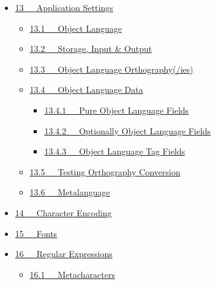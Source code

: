 \documentclass[letterpaper,10pt,english]{sphinxmanual}
\begin{document}
{\begin{minipage}{0.95\linewidth}
\begin{itemize}
\begin{itemize}
\begin{itemize}
\end{itemize}

\end{itemize}

\item {} 
{\hyperref[documentation:application-settings]{13   Application Settings}}
\begin{itemize}
\item {} 
{\hyperref[documentation:object-language]{13.1   Object Language}}

\item {} 
{\hyperref[documentation:storage-input-output]{13.2   Storage, Input \& Output}}

\item {} 
{\hyperref[documentation:object-language-orthography-ies]{13.3   Object Language Orthography(/ies)}}

\item {} 
{\hyperref[documentation:object-language-data]{13.4   Object Language Data}}
\begin{itemize}
\item {} 
{\hyperref[documentation:pure-object-language-fields]{13.4.1   Pure Object Language Fields}}

\item {} 
{\hyperref[documentation:optionally-object-language-fields]{13.4.2   Optionally Object Language Fields}}

\item {} 
{\hyperref[documentation:object-language-tag-fields]{13.4.3   Object Language Tag Fields}}

\end{itemize}

\item {} 
{\hyperref[documentation:testing-orthography-conversion]{13.5   Testing Orthography Conversion}}

\item {} 
{\hyperref[documentation:metalanguage]{13.6   Metalanguage}}

\end{itemize}

\item {} 
{\hyperref[documentation:character-encoding]{14   Character Encoding}}

\item {} 
{\hyperref[documentation:fonts]{15   Fonts}}

\item {} 
{\hyperref[documentation:regular-expressions]{16   Regular Expressions}}
\begin{itemize}
\item {} 
{\hyperref[documentation:metacharacters]{16.1   Metacharacters}}


\end{itemize}
\end{itemize}
\end{minipage}}
\end{document}
